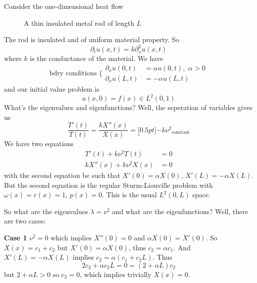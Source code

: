 \begin{ex}
Consider the one-dimensional heat flow
\begin{figure}[t]
  \begin{center}
    
  \end{center}
\caption{A thin insulated metal rod of length $L$}
\label{fig:30April2008:img1}
\end{figure}
The rod is insulated and of uniform material property. So
\begin{equation}
\partial_{t}u(x,t) = k\partial_{x}^{2}u(x,t)
\end{equation}
where $k$ is the conductance of the material. We have
\begin{equation}
\text{bdry conditions  }\bigg\{\begin{array}{rl}
\partial_{x}u(0,t) &= \alpha u(0,t),\,\,\alpha>0\\
\partial_{x}u(L,t) &= -\alpha u(L,t)
\end{array}
\end{equation}
and our initial value problem is
\begin{equation}
u(x,0) = f(x)\in L^{2}(0,1)
\end{equation}
What's the eigenvalues and eigenfunctions? Well, the
seperation of variables gives us
\begin{equation}
\frac{T'(t)}{T(t)} = \frac{kX''(x)}{X(x)} = \underbracket[0.5pt]{-k\nu^{2}}_{\text{constant}}
\end{equation}
We have two equations
\begin{subequations}
\begin{align}
T'(t)+k\nu^{2}T(t)&=0\\
kX''(x)+k\nu^{2}X(x)&=0
\end{align}
\end{subequations}
with the second equation be such that $X'(0)=\alpha X(0)$,
$X'(L)=-\alpha X(L)$. But the second equation is the regular
Sturm-Liouville problem with $\omega(x)=r(x)=1$,
$p(x)=0$. This is the usual $L^{2}(0,L)$ space.

So what are the eigenvalues $\lambda=\nu^{2}$ and what are
the eigenfunctions? Well, there are two cases:

\textbf{Case 1} $\nu^2=0$ which implies $X''(0)=0$ and
$\alpha X(0)=X'(0)$. So $X(x)=c_1 + c_2$ but $X'(0)=\alpha
X(0)$, thus $c_2 = \alpha c_1$. And $X'(L)=-\alpha X(L)$
implies $c_2 = \alpha(c_1 + c_2 L)$. Thus 
$$2c_2+\alpha c_2L=0=(2+\alpha L)c_2 $$
but $2+\alpha L>0$ so $c_2=0$, which implies trivially
$X(x)=0$.



\end{ex}
